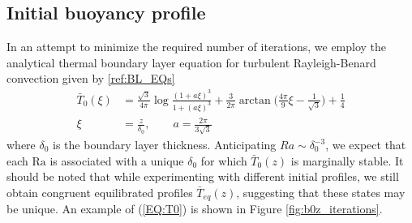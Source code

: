 \documentclass[reprint,amsmath,amssymb,aps]{revtex4-1}
\newcommand\Ra{\mathrm{Ra}}
\begin{document}
\subsection{Initial buoyancy profile} \label{sec:initial_profile}
In an attempt to minimize the required number of iterations, we employ the analytical thermal boundary layer equation for turbulent Rayleigh-Benard convection given by \ref{ref:BL_EQs}
\begin{align}
    \bar{T}_0(\xi) &= \frac{\sqrt{3}}{4\pi} \log \frac{(1 + a\xi)^3}{1 + (a\xi)^3} + \frac{3}{2\pi} \arctan \Big( \frac{4\pi}{9}\xi - \frac{1}{\sqrt{3}} \Big) + \frac{1}{4} \nonumber \\
    \xi &= \frac{z}{\delta_0}, \qquad a = \frac{2\pi}{3\sqrt{3}}\label{EQ:T0}
\end{align}
where $\delta_0$ is the boundary layer thickness. Anticipating $Ra \sim \delta^{-3}_0$, we expect that each $\Ra$ is associated with a unique $\delta_0$ for which $\bar{T}_0(z)$ is marginally stable. It should be noted that while experimenting with different initial profiles, we still obtain congruent equilibrated profiles $\bar{T}_{eq}(z)$, suggesting that these states may be unique. An example of (\ref{EQ:T0}) is shown in Figure \ref{fig:b0z_iterations}.

\end{document}
